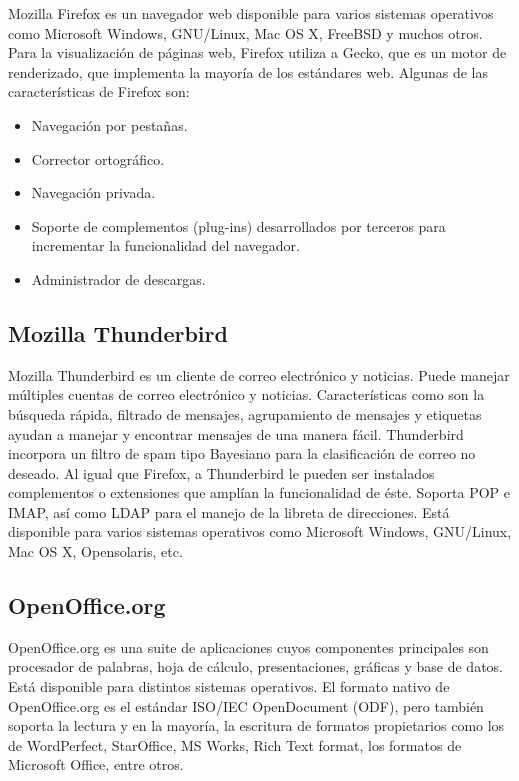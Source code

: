 Mozilla Firefox es un navegador web disponible para varios sistemas operativos como Microsoft Windows, GNU/Linux, Mac OS X, FreeBSD y muchos otros. Para la visualización de páginas web, Firefox utiliza a Gecko, que es un motor de renderizado, que implementa la mayoría de los estándares web. Algunas de las características de Firefox son:

\begin{itemize}
 \item Navegación por pestañas.
 \item Corrector ortográfico.
 \item Navegación privada.
 \item Soporte de complementos (plug-ins) desarrollados por terceros para incrementar la funcionalidad del navegador.
 \item Administrador de descargas.
\end{itemize}

\subsection{Mozilla Thunderbird}
\label{sec:thunderbird}

Mozilla Thunderbird es un cliente de correo electrónico y noticias. Puede manejar múltiples cuentas de correo electrónico y noticias. Características como son la búsqueda rápida, filtrado de mensajes, agrupamiento de mensajes y etiquetas ayudan a manejar y encontrar mensajes de una manera fácil. Thunderbird incorpora un filtro de spam tipo Bayesiano para la clasificación de correo no deseado. Al igual que Firefox, a Thunderbird le pueden ser instalados complementos o extensiones que amplían la funcionalidad de éste. Soporta POP e IMAP, así como LDAP para el manejo de la libreta de direcciones. Está disponible para varios sistemas operativos como Microsoft Windows, GNU/Linux, Mac OS X, Opensolaris, etc.

\subsection{OpenOffice.org}
\label{sec:openoffice}

OpenOffice.org es una suite de aplicaciones cuyos componentes principales son procesador de palabras, hoja de cálculo, presentaciones, gráficas y base de datos. Está disponible para distintos sistemas operativos. El formato nativo de OpenOffice.org es el estándar ISO/IEC OpenDocument (ODF), pero también soporta la lectura y en la mayoría, la escritura de formatos propietarios como los de WordPerfect, StarOffice, MS Works, Rich Text format, los formatos de Microsoft Office, entre otros.

